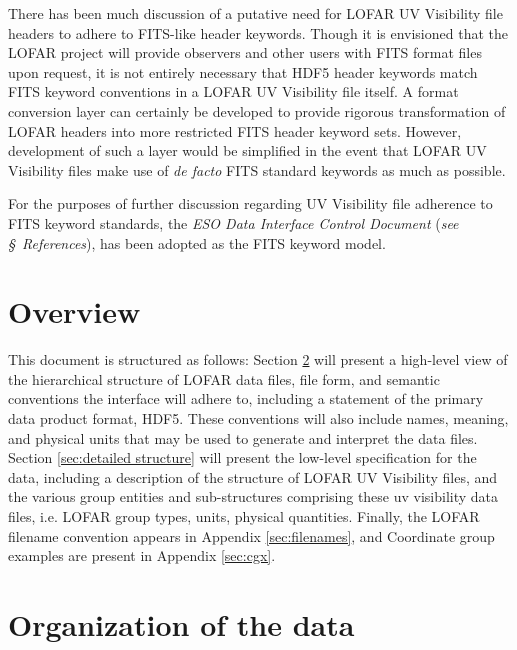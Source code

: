 \documentclass[a4paper,10pt,bibtotoc]{scrartcl}
\begin{document}
There has been much discussion of a putative need for LOFAR UV
Visibility file headers to adhere to FITS-like header keywords.
Though it is envisioned that the LOFAR project will provide observers
and other users with FITS format files upon request, it is not
entirely necessary that HDF5 header keywords match FITS keyword
conventions in a LOFAR UV Visibility file itself.  A format conversion
layer can certainly be developed to provide rigorous transformation of
LOFAR headers into more restricted FITS header keyword sets.  However,
development of such a layer would be simplified in the event that
LOFAR UV Visibility files make use of \textit{de facto} FITS standard
keywords as much as possible.

For the purposes of further discussion regarding UV Visibility file
adherence to FITS keyword standards, the \textit{ESO Data Interface
  Control Document} (\textit{see \S\ References}), has been adopted as
the FITS keyword model.




\section{Overview}
\label{sec:overview}

This document is structured as follows: Section \ref{sec:structure}
will present a high-level view of the hierarchical  structure of LOFAR
data files, file form, and semantic conventions the interface will
adhere to, including a statement of the primary data product format,
HDF5. These conventions will also include names, meaning, and physical
units that may be used to generate and interpret the data
files. Section \ref{sec:detailed structure} will present the low-level
specification for the data, including a description of the structure
of LOFAR UV Visibility files, and the various group entities and
sub-structures comprising these uv visibility data files, i.e. LOFAR
group types, units, physical quantities.   Finally, the LOFAR filename
convention appears in Appendix \ref{sec:filenames}, and Coordinate
group examples are present in Appendix \ref{sec:cgx}.


\section{Organization of the data}
\label{sec:structure}
\end{document}
